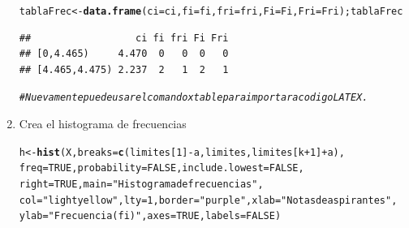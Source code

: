 \documentclass[12pt,letterpaper]{article}\usepackage[]{graphicx}\usepackage[]{color}
\makeatletter
\newcommand{\hlnum}[1]{\textcolor[rgb]{0.686,0.059,0.569}{#1}}%
\newcommand{\hlstr}[1]{\textcolor[rgb]{0.192,0.494,0.8}{#1}}%
\newcommand{\hlcom}[1]{\textcolor[rgb]{0.678,0.584,0.686}{\textit{#1}}}%
\newcommand{\hlopt}[1]{\textcolor[rgb]{0,0,0}{#1}}%
\newcommand{\hlstd}[1]{\textcolor[rgb]{0.345,0.345,0.345}{#1}}%
\newcommand{\hlkwb}[1]{\textcolor[rgb]{0.69,0.353,0.396}{#1}}%
\newcommand{\hlkwc}[1]{\textcolor[rgb]{0.333,0.667,0.333}{#1}}%
\newcommand{\hlkwd}[1]{\textcolor[rgb]{0.737,0.353,0.396}{\textbf{#1}}}%
\newenvironment{kframe}{%
 \def\at@end@of@kframe{}%
 \ifinner\ifhmode%
  \def\at@end@of@kframe{\end{minipage}}%
  \begin{minipage}{\columnwidth}%
 \fi\fi%
 \def\FrameCommand##1{\hskip\@totalleftmargin \hskip-\fboxsep
 \colorbox{shadecolor}{##1}\hskip-\fboxsep
     \hskip-\linewidth \hskip-\@totalleftmargin \hskip\columnwidth}%
 \MakeFramed {\advance\hsize-\width
   \@totalleftmargin\z@ \linewidth\hsize
   \@setminipage}}%
 {\par\unskip\endMakeFramed%
 \at@end@of@kframe}
\newenvironment{knitrout}{}{} %
\makeatother
\begin{document}
\begin{enumerate}
\begin{knitrout}
\begin{kframe}
\begin{alltt}
\hlstd{tablaFrec} \hlkwb{<-} \hlkwd{data.frame}\hlstd{(}\hlkwc{ci}\hlstd{=ci,} \hlkwc{fi}\hlstd{=fi,} \hlkwc{fri}\hlstd{=fri,} \hlkwc{Fi}\hlstd{=Fi,} \hlkwc{Fri}\hlstd{=Fri); tablaFrec}
\end{alltt}
\begin{verbatim}
##                  ci fi fri Fi Fri
## [0,4.465)     4.470  0   0  0   0
## [4.465,4.475) 2.237  2   1  2   1
\end{verbatim}
\begin{alltt}
\hlcom{# Nuevamente puede usar el comando xtable para importar a codigo LATEX. }
\end{alltt}
\end{kframe}
\end{knitrout}

\item Crea el histograma de frecuencias

\begin{knitrout}
\color{fgcolor}\begin{kframe}
\begin{alltt}
\hlstd{h} \hlkwb{<-} \hlkwd{hist}\hlstd{(X,} \hlkwc{breaks}\hlstd{=}\hlkwd{c}\hlstd{(limites[}\hlnum{1}\hlstd{]}\hlopt{-}\hlstd{a, limites, limites[k}\hlopt{+}\hlnum{1}\hlstd{]}\hlopt{+}\hlstd{a),}
          \hlkwc{freq} \hlstd{=} \hlnum{TRUE}\hlstd{,} \hlkwc{probability} \hlstd{=} \hlnum{FALSE}\hlstd{,} \hlkwc{include.lowest} \hlstd{=} \hlnum{FALSE}\hlstd{,}
          \hlkwc{right} \hlstd{=} \hlnum{TRUE}\hlstd{,} \hlkwc{main} \hlstd{=} \hlstr{"Histograma de frecuencias"}\hlstd{,}
\hlkwc{col}\hlstd{=}\hlstr{"lightyellow"}\hlstd{,} \hlkwc{lty}\hlstd{=}\hlnum{1}\hlstd{,} \hlkwc{border}\hlstd{=}\hlstr{"purple"}\hlstd{,} \hlkwc{xlab}\hlstd{=}\hlstr{"Notas de aspirantes"}\hlstd{,}
\hlkwc{ylab}\hlstd{=}\hlstr{"Frecuencia (fi)"}\hlstd{,} \hlkwc{axes}\hlstd{=}\hlnum{TRUE}\hlstd{,} \hlkwc{labels}\hlstd{=}\hlnum{FALSE}\hlstd{)}
\end{alltt}



\end{kframe}
\end{knitrout}
\end{enumerate}
\end{document}
